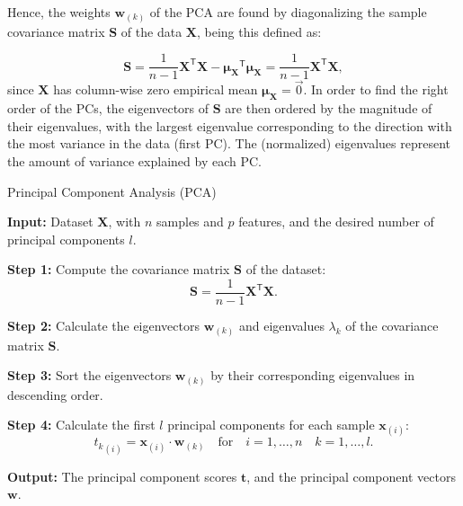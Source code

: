 Hence, the weights $\mathbf{w}_{(k)}$ of the PCA are found by diagonalizing the sample covariance matrix $\mathbf{S}$ of the data $\mathbf{X}$, being this defined as:

\begin{equation}
\mathbf{S} =  \frac{1}{n-1} \mathbf{X}^{\mathsf{T}} \mathbf{X} -  \mathbf{\mu_X}^{\mathsf{T}}\mathbf{\mu_X}= \frac{1}{n-1} \mathbf{X}^{\mathsf{T}} \mathbf{X},
\end{equation}
since $\mathbf{X}$ has column-wise zero empirical mean $\mathbf{\mu_X}=\vec{0}$. 
In order to find the right order of the PCs, the eigenvectors of $\mathbf{S}$ are then ordered by the magnitude of their eigenvalues, with the largest eigenvalue corresponding to the direction with the most variance in the data (first PC). The (normalized) eigenvalues represent the amount of variance explained by each PC.


\begin{algorithm}
\caption{Principal Component Analysis (PCA)}
\begin{algorithmic}[1]
    \STATE \textbf{Input:} Dataset \(\mathbf{X}\), with \(n\) samples and \(p\) features, and the desired number of principal components \(l\).

    \STATE \textbf{Step 1:} Compute the covariance matrix \(\mathbf{S}\) of the dataset:
    \begin{equation*}
    \mathbf{S} = \frac{1}{n - 1} \mathbf{X}^{\mathsf{T}} \mathbf{X}.
    \end{equation*}

    \STATE \textbf{Step 2:} Calculate the eigenvectors \(\mathbf{w}_{(k)}\) and eigenvalues \(\lambda_k\) of the covariance matrix \(\mathbf{S}\).

    \STATE \textbf{Step 3:} Sort the eigenvectors \(\mathbf{w}_{(k)}\) by their corresponding eigenvalues in descending order.

    \STATE \textbf{Step 4:} Calculate the first \(l\) principal components for each sample \(\mathbf{x}_{(i)}\):
    \begin{equation*}
    {t_{k}}_{(i)} = \mathbf{x}_{(i)} \cdot \mathbf{w}_{(k)} \quad \text{for} \quad i = 1, \ldots, n \quad k = 1, \ldots, l.
    \end{equation*}
    
    \STATE \textbf{Output:} The principal component scores \(\mathbf{t}\), and the principal component vectors \(\mathbf{w}\).
\end{algorithmic}
\end{algorithm}


